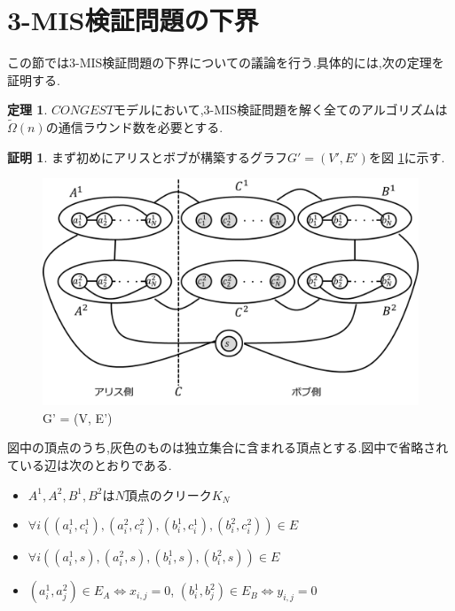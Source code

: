 \documentclass[12pt]{thesis}
\theoremstyle{definition}
\newtheorem{theorem}{定理}[chapter]
\newtheorem*{prf*}{証明}
\begin{document}
\section{3-MIS検証問題の下界}
この節では3-MIS検証問題の下界についての議論を行う.具体的には,次の定理を証明する.
\begin{theorem}
$CONGEST$モデルにおいて,3-MIS検証問題を解く全てのアルゴリズムは$\tilde{\Omega} (n)$の通信ラウンド数を必要とする.
\end{theorem}

\begin{prf*}
まず初めにアリスとボブが構築するグラフ$G' = (V', E')$を図 \ref{3MIS}に示す. 

\begin{figure}[ht]
\begin{center}
\includegraphics[width=120mm]{3MIS.png}
\end{center}
\caption{G' = (V, E')}
\label{3MIS}
\end{figure}

図中の頂点のうち,灰色のものは独立集合に含まれる頂点とする.図中で省略されている辺は次のとおりである.
\begin{itemize}
\item $A^{1}, A^{2}, B^{1}, B^{2}$は$N$頂点のクリーク$K_{N}$
\item $\forall i((a_{i}^{1}, c_{i}^{1}), (a_{i}^{2}, c_{i}^{2}), (b_{i}^{1}, c_{i}^{1}), (b_{i}^{2}, c_{i}^{2})) \in E$
\item $\forall i((a_{i}^{1}, s), (a_{i}^{2}, s), (b_{i}^{1}, s), (b_{i}^{2}, s)) \in E$
\item $(a_{i}^{1}, a_{j}^{2}) \in E_{A} \Leftrightarrow x_{i, j} = 0$, $(b_{i}^{1}, b_{j}^{2}) \in E_{B} \Leftrightarrow y_{i, j} = 0$
\end{itemize}


\end{prf*}
\end{document}
